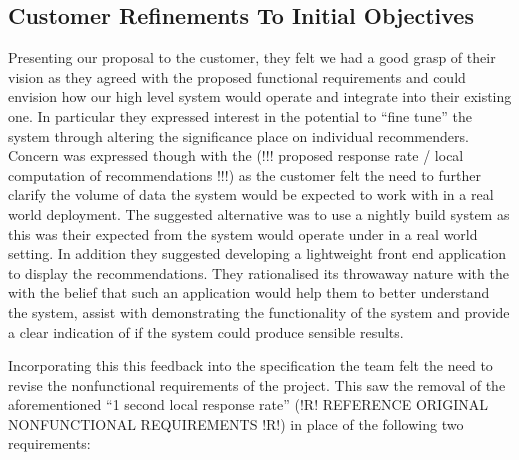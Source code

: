 \documentclass{l3proj}
\begin{document}

\subsection{Customer Refinements To Initial Objectives}
\label{sec:custrefineinitobj}


Presenting our proposal to the customer, they felt we had a good grasp of their vision as they agreed with the proposed functional requirements and could envision how our high level system would operate and integrate into their existing one. In particular they expressed interest in the potential to “fine tune” the system through altering the significance place on individual recommenders. Concern was expressed though with the (!!! proposed response rate / local computation of recommendations !!!) as the customer felt the need to further clarify the volume of data the system would be expected to work with in a real world deployment. The suggested alternative was to use a nightly build system as this was their expected from the system would operate under in a real world setting. In addition they suggested developing a lightweight front end application to display the recommendations. They rationalised its throwaway nature with the with the belief that such an application would help them to better understand the system, assist with demonstrating the functionality of the system and provide a clear indication of if the system could produce sensible results. 

Incorporating this this feedback into the specification  the team felt the need to revise the nonfunctional requirements of the project. This saw the removal of the aforementioned “1 second local response rate” (!R! REFERENCE ORIGINAL NONFUNCTIONAL REQUIREMENTS !R!) in place of the following two requirements:
\end{document}

